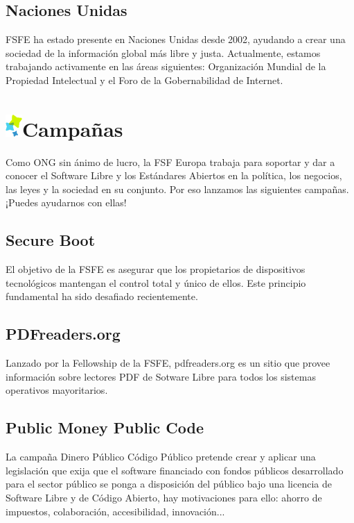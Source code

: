 \documentclass[10pt,foldmark,tumble]{leaflet}
\begin{document}
\subsection{Naciones Unidas}

    FSFE ha estado presente en Naciones Unidas desde 2002, ayudando a crear una sociedad de la información global más libre y justa. Actualmente, estamos trabajando activamente en las áreas siguientes: Organización Mundial de la Propiedad Intelectual y el Foro de la Gobernabilidad de Internet.

\section{\includegraphics{item.png}Campañas}

Como ONG sin ánimo de lucro, la FSF Europa trabaja para soportar y dar a conocer el Software Libre y los Estándares Abiertos en la política, los negocios, las leyes y la sociedad en su conjunto. Por eso lanzamos las siguientes campañas. ¡Puedes ayudarnos con ellas!

\subsection{Secure Boot}

    El objetivo de la FSFE es asegurar que los propietarios de dispositivos tecnológicos mantengan el control total y único de ellos. Este principio fundamental ha sido desafiado recientemente.

\subsection{PDFreaders.org}

    Lanzado por la Fellowship de la FSFE, pdfreaders.org es un sitio que provee información sobre lectores PDF de Sotware Libre para todos los sistemas operativos mayoritarios.
    
\subsection{Public Money Public Code}

    La campaña Dinero Público Código Público pretende crear y aplicar una legislación que exija que el software financiado con fondos públicos desarrollado para el sector público se ponga a disposición del público bajo una licencia de Software Libre y de Código Abierto, hay motivaciones para ello: ahorro de impuestos, colaboración, accesibilidad, innovación...
    
\end{document}
